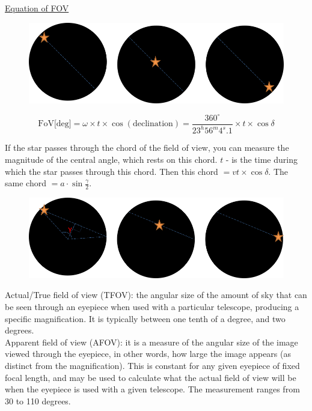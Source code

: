 \documentclass[a4paper,12pt]{extarticle}
\begin{document}
\underline{\textsf{Equation of FOV}}\\

\begin{figure}[H]
	\centering
	\includegraphics[width=0.9\linewidth]{FOV1.png}
\end{figure}
\begin{defi}
	\[\text{FoV[deg]}= \omega \times t \times \cos(\text{declination})=\frac{360^\circ}{23^h56^m4^s.1}\times t\times \cos\delta\]
\end{defi}

If the star passes through the chord of the field of view, you can measure the magnitude of the central angle, which rests on this chord. $t$ - is the time during which the star passes through this chord. Then this chord $= vt \times \cos\delta $. The same chord $=a\cdot \sin\frac{\gamma}{2}$. 

\begin{figure}[H]
	\centering
	\includegraphics[width=0.9\linewidth]{FOV2.png}
\end{figure}

\textsf{Actual/True field of view (TFOV):} the angular size of the amount of sky that can	be seen through an eyepiece when used with a particular telescope, producing a specific magnification. It is typically between one tenth of a degree, and two degrees.\\ 

\textsf{Apparent field of view (AFOV):} it is a measure of the angular size of the image viewed through the eyepiece, in other words, how large the image appears (as distinct from the magnification). This is constant for any given eyepiece of fixed focal length, and may be used to calculate what the actual field of view will be when the eyepiece is used with a given telescope. The measurement ranges from 30 to 110 degrees.\\
\end{document}
